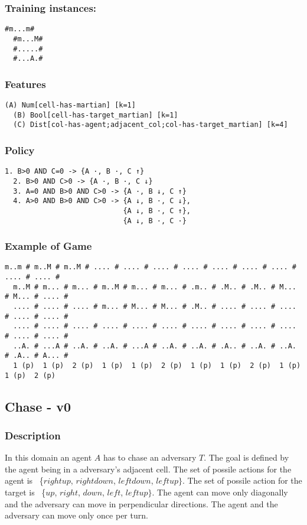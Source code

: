 \documentclass[a4paper]{article}
\begin{document}
\subsubsection{Training instances:}
\begin{Verbatim}[fontsize=\footnotesize]
  #m...m#
  #m...M#
  #.....#
  #...A.#
\end{Verbatim}

\subsubsection{Features}
\begin{Verbatim}[fontsize=\footnotesize]
  (A) Num[cell-has-martian] [k=1]
  (B) Bool[cell-has-target_martian] [k=1]
  (C) Dist[col-has-agent;adjacent_col;col-has-target_martian] [k=4]
\end{Verbatim}

\subsubsection{Policy}
\begin{Verbatim}[fontsize=\footnotesize]
  1. B>0 AND C=0 -> {A ·, B ·, C ↑}
  2. B>0 AND C>0 -> {A ·, B ·, C ↓}
  3. A=0 AND B>0 AND C>0 -> {A ·, B ↓, C ↑}
  4. A>0 AND B>0 AND C>0 -> {A ↓, B ·, C ↓},
                            {A ↓, B ·, C ↑},
                            {A ↓, B ·, C ·}
\end{Verbatim}

\subsubsection{Example of Game}
\begin{Verbatim}[fontsize=\footnotesize]
  m..m # m..M # m..M # .... # .... # .... # .... # .... # .... # .... # .... # .... #
  m..M # m... # m... # m..M # m... # m... # .m.. # .M.. # .M.. # M... # M... # .... #
  .... # .... # .... # m... # M... # M... # .M.. # .... # .... # .... # .... # .... #
  .... # .... # .... # .... # .... # .... # .... # .... # .... # .... # .... # .... #
  ..A. # ...A # ..A. # ..A. # ...A # ..A. # ..A. # .A.. # ..A. # ..A. # .A.. # A... #
  1 (p)  1 (p)  2 (p)  1 (p)  1 (p)  2 (p)  1 (p)  1 (p)  2 (p)  1 (p)  1 (p)  2 (p)
\end{Verbatim}

\subsection{Chase - v0}
\subsubsection{Description}
In this domain an agent $A$ has to chase an adversary $T$. The goal is defined by the agent being in a adversary's adjacent cell. The set of possile actions for the agent is ~\{$rightup$, $rightdown$, $leftdown$, $leftup\}$.
The set of possile action for the target is ~\{$up$, $right$, $down$, $left$, $leftup\}$. The agent can move only diagonally and the adversary can move in perpendicular directions.  The agent and the adversary can move only once per turn.
\end{document}
